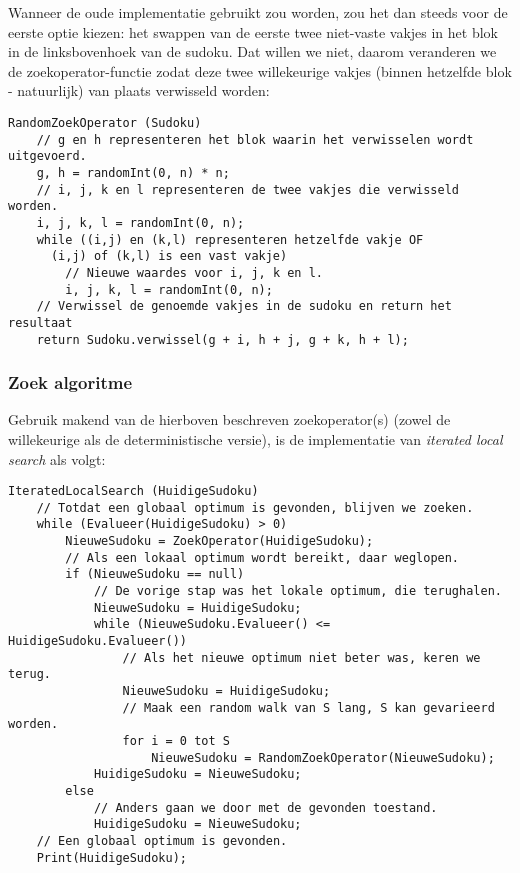 \documentclass[]{report}
\begin{document}
Wanneer de oude implementatie gebruikt zou worden, zou het dan steeds voor de eerste optie kiezen: het swappen van de eerste twee niet-vaste vakjes in het blok in de linksbovenhoek van de sudoku. Dat willen we niet, daarom veranderen we de zoekoperator-functie zodat deze twee willekeurige vakjes (binnen hetzelfde blok - natuurlijk) van plaats verwisseld worden:

\begin{minipage}{\textwidth}
\begin{lstlisting}
RandomZoekOperator (Sudoku)
	// g en h representeren het blok waarin het verwisselen wordt uitgevoerd.
	g, h = randomInt(0, n) * n;
	// i, j, k en l representeren de twee vakjes die verwisseld worden.
	i, j, k, l = randomInt(0, n);
	while ((i,j) en (k,l) representeren hetzelfde vakje OF
	  (i,j) of (k,l) is een vast vakje)
		// Nieuwe waardes voor i, j, k en l.
		i, j, k, l = randomInt(0, n);
	// Verwissel de genoemde vakjes in de sudoku en return het resultaat
	return Sudoku.verwissel(g + i, h + j, g + k, h + l);
\end{lstlisting}
\end{minipage}

\subsubsection{Zoek algoritme}
Gebruik makend van de hierboven beschreven zoekoperator(s) (zowel de willekeurige als de deterministische versie), is de implementatie van \textit{iterated local search} als volgt:

\begin{minipage}{\textwidth}
\begin{lstlisting}
IteratedLocalSearch (HuidigeSudoku)
	// Totdat een globaal optimum is gevonden, blijven we zoeken.
	while (Evalueer(HuidigeSudoku) > 0)
		NieuweSudoku = ZoekOperator(HuidigeSudoku);
		// Als een lokaal optimum wordt bereikt, daar weglopen.
		if (NieuweSudoku == null)
			// De vorige stap was het lokale optimum, die terughalen.
			NieuweSudoku = HuidigeSudoku;
			while (NieuweSudoku.Evalueer() <= HuidigeSudoku.Evalueer())
				// Als het nieuwe optimum niet beter was, keren we terug.
				NieuweSudoku = HuidigeSudoku; 
				// Maak een random walk van S lang, S kan gevarieerd worden.
				for i = 0 tot S
					NieuweSudoku = RandomZoekOperator(NieuweSudoku);
			HuidigeSudoku = NieuweSudoku;
		else 
			// Anders gaan we door met de gevonden toestand.
			HuidigeSudoku = NieuweSudoku;
	// Een globaal optimum is gevonden.
	Print(HuidigeSudoku);
\end{lstlisting}
\end{minipage}
\end{document}
